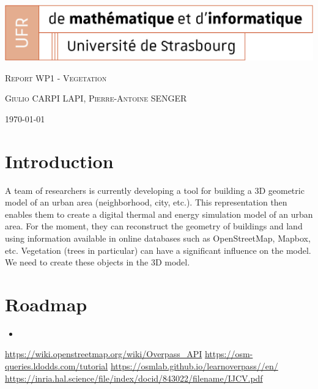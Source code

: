 \documentclass[11pt]{article}
\begin{document}
\begin{titlepage}
    \centering
    \includegraphics[width=1\textwidth]{images/logo_Uni.png}\par\vspace{1cm}
    {\scshape\Large Report WP1 - Vegetation \par}
    \vspace{1cm}
    {\scshape\large Giulio CARPI LAPI, Pierre-Antoine SENGER\par}
    \vspace{1cm}
    {\large \today\par}
\end{titlepage}
 
\tableofcontents %

\newpage %

\section{Introduction}

A team of researchers is currently developing a tool for building a 3D geometric model of an urban area (neighborhood, city, etc.).
This representation then enables them to create a digital thermal and energy simulation model of an urban area.
For the moment, they can reconstruct the geometry of buildings and land using information available in online databases such as OpenStreetMap, Mapbox, etc.
Vegetation (trees in particular) can have a significant influence on the model. We need to create these objects in the 3D model.

\section{Roadmap}
\begin{itemize}
	\item 
\end{itemize}

\begin{thebibliography}{9}
     \url{https://wiki.openstreetmap.org/wiki/Overpass_API}
	 \url{https://osm-queries.ldodds.com/tutorial}
	 \url{https://osmlab.github.io/learnoverpass//en/}
     \url{https://inria.hal.science/file/index/docid/843022/filename/IJCV.pdf}

\end{thebibliography}
\end{document}
